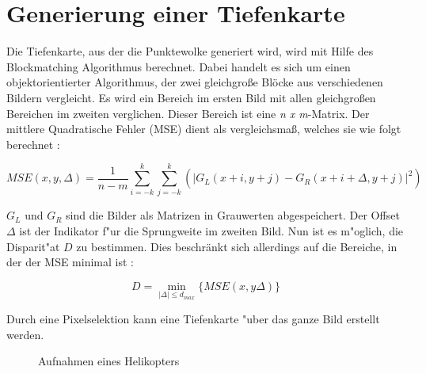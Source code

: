 \section{Generierung einer Tiefenkarte} 
\label{sec:gernerierungdep}

Die Tiefenkarte, aus der die Punktewolke generiert wird, wird mit Hilfe des Blockmatching Algorithmus berechnet. Dabei handelt es sich um einen objektorientierter Algorithmus, der zwei gleichgroße Blöcke aus verschiedenen Bildern vergleicht. Es wird ein Bereich im ersten Bild mit allen gleichgroßen Bereichen im zweiten verglichen. Dieser Bereich ist eine \textit{n x m}-Matrix. Der mittlere Quadratische Fehler (MSE) dient als vergleichsmaß, welches sie wie folgt berechnet \cite{HAW}:

\begin{equation}
MSE(x,y,\Delta) = \dfrac{1}{n-m} \sum_{i=-k}^k \sum_{j=-k}^k (|G_{L}(x+i, y+j) - G_{R}(x+i+\Delta, y+j)|^2)
\end{equation}

\noindent $G_{L}$ und $G_{R}$ sind die Bilder als Matrizen in Grauwerten abgespeichert. Der Offset $\Delta$ ist der Indikator f"ur die Sprungweite im zweiten Bild. Nun ist es m"oglich, die Disparit"at $D$ zu bestimmen. Dies beschränkt sich allerdings auf die Bereiche, in der der MSE minimal ist \cite{HAW}:

\begin{equation}
D=\min_{|\Delta|\leq d_{max}} \{MSE(x,y\Delta)\}
\end{equation}

\noindent Durch eine Pixelselektion kann eine Tiefenkarte "uber das ganze Bild erstellt werden.

\begin{figure}%
	\centering
	\qquad
	\caption{Aufnahmen eines Helikopters}%
	\label{fig:stereoheli}%
\end{figure}

